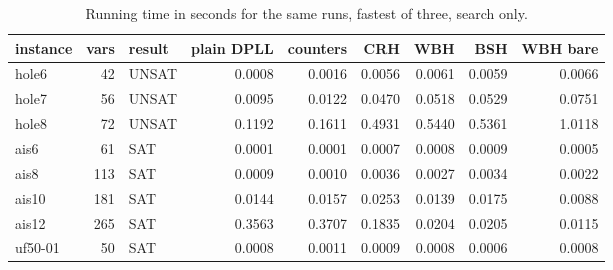 \begin{table}[H]
\centering
\small
\setlength{\tabcolsep}{5pt}
\begin{tabular}{lrlrrrrrr}
\toprule
instance & vars & result & plain DPLL & counters & CRH & WBH & BSH & WBH bare \\
\midrule
hole6 & 42 & UNSAT & 0.0008 & 0.0016 & 0.0056 & 0.0061 & 0.0059 & 0.0066 \\
hole7 & 56 & UNSAT & 0.0095 & 0.0122 & 0.0470 & 0.0518 & 0.0529 & 0.0751 \\
hole8 & 72 & UNSAT & 0.1192 & 0.1611 & 0.4931 & 0.5440 & 0.5361 & 1.0118 \\
ais6 & 61 & SAT & 0.0001 & 0.0001 & 0.0007 & 0.0008 & 0.0009 & 0.0005 \\
ais8 & 113 & SAT & 0.0009 & 0.0010 & 0.0036 & 0.0027 & 0.0034 & 0.0022 \\
ais10 & 181 & SAT & 0.0144 & 0.0157 & 0.0253 & 0.0139 & 0.0175 & 0.0088 \\
ais12 & 265 & SAT & 0.3563 & 0.3707 & 0.1835 & 0.0204 & 0.0205 & 0.0115 \\
uf50-01 & 50 & SAT & 0.0008 & 0.0011 & 0.0009 & 0.0008 & 0.0006 & 0.0008 \\
\bottomrule
\end{tabular}
\caption{Running time in seconds for the same runs, fastest of three, search only.}
\label{tab:times}
\end{table}
